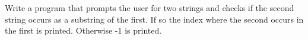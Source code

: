 Write a program that prompts the user for two strings and checks if the second string occurs as a substring of the first. If so the index where the second occurs in the first is printed. Otherwise -1 is printed.

